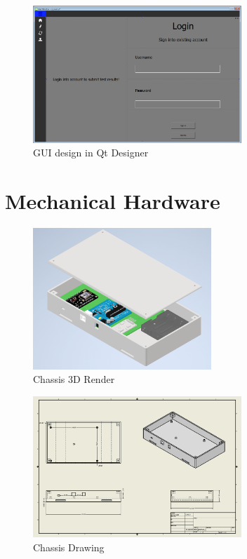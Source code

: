 \documentclass[12pt, titlepage]{article}
\begin{document}
\begin{figure}[hbt!]
  \begin{center}
  \includegraphics[width=0.7\textwidth]{GUI_designer}
  \caption{GUI design in Qt Designer}
  \label{Fig_SystemContext} 
  \end{center}
  \end{figure}


\section{Mechanical Hardware}
  \begin{figure}[h!]
    \begin{center}
    \includegraphics[width=0.6\textwidth]{Chassis_3D_Render.png}
    \caption{Chassis 3D Render}
    \label{Fig_SystemContext} 
    \end{center}
    \end{figure}

  \begin{figure}[h!]
    \begin{center}
    \includegraphics[width=0.7\textwidth]{Chassis_Drawing.png}
    \caption{Chassis Drawing}
    \label{Fig_SystemContext} 
    \end{center}
    \end{figure}
\end{document}
